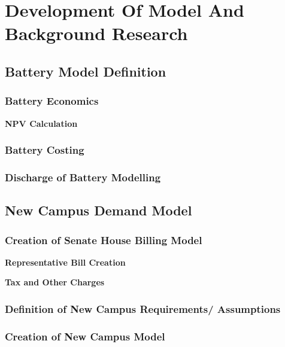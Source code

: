 \newpage

\section{Development Of Model And Background
Research}\label{development-of-model-and-background-research}

\subsection{Battery Model Definition}\label{battery-model-definition}

\subsubsection{Battery Economics}\label{battery-economics}

\textbf{NPV Calculation}

\subsubsection{Battery Costing}\label{battery-costing}

\subsubsection{Discharge of Battery
Modelling}\label{discharge-of-battery-modelling}

\subsection{New Campus Demand Model}\label{new-campus-demand-model}

\subsubsection{Creation of Senate House Billing
Model}\label{creation-of-senate-house-billing-model}

\textbf{Representative Bill Creation}

\textbf{Tax and Other Charges}

\subsubsection{Definition of New Campus Requirements/
Assumptions}\label{definition-of-new-campus-requirements-assumptions}

\subsubsection{Creation of New Campus
Model}\label{creation-of-new-campus-model}

